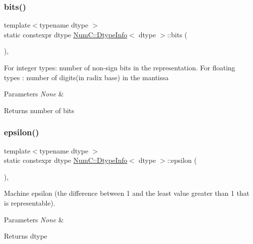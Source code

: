 \subsubsection{\texorpdfstring{bits()}{bits()}}
{\footnotesize\ttfamily template$<$typename dtype $>$ \\
static constexpr dtype \mbox{\hyperlink{class_num_c_1_1_dtype_info}{Num\+C\+::\+Dtype\+Info}}$<$ dtype $>$\+::bits (\begin{DoxyParamCaption}{ }\end{DoxyParamCaption})\hspace{0.3cm}{\ttfamily [inline]}, {\ttfamily [static]}}

For integer types\+: number of non-\/sign bits in the representation. For floating types \+: number of digits(in radix base) in the mantissa


\begin{DoxyParams}{Parameters}
{\em None} & \\
\hline
\end{DoxyParams}
\begin{DoxyReturn}{Returns}
number of bits 
\end{DoxyReturn}
\mbox{\label{class_num_c_1_1_dtype_info_a2f1d9e60fc1d2d64a69d4012ec72c43b}} 
\subsubsection{\texorpdfstring{epsilon()}{epsilon()}}
{\footnotesize\ttfamily template$<$typename dtype $>$ \\
static constexpr dtype \mbox{\hyperlink{class_num_c_1_1_dtype_info}{Num\+C\+::\+Dtype\+Info}}$<$ dtype $>$\+::epsilon (\begin{DoxyParamCaption}{ }\end{DoxyParamCaption})\hspace{0.3cm}{\ttfamily [inline]}, {\ttfamily [static]}}

Machine epsilon (the difference between 1 and the least value greater than 1 that is representable).


\begin{DoxyParams}{Parameters}
{\em None} & \\
\hline
\end{DoxyParams}
\begin{DoxyReturn}{Returns}
dtype 
\end{DoxyReturn}
\mbox{\label{class_num_c_1_1_dtype_info_a6409e79e849007fae15f9042ccc5ac6c}} 
